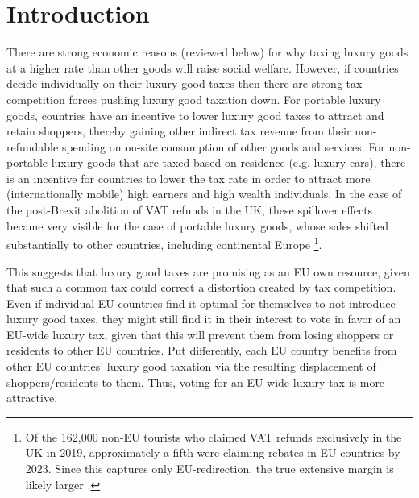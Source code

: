 \documentclass{article}
\begin{document}
\clearpage

\section{Introduction}

There are strong economic reasons (reviewed %
below) for why taxing luxury goods at a higher rate than other goods will raise social welfare. However, if countries decide individually on their luxury good taxes then there are strong tax competition forces pushing luxury good taxation down. For portable luxury goods, countries have an incentive to lower luxury good taxes to attract and retain shoppers, thereby gaining other indirect tax revenue from their non-refundable spending on on-site consumption of other goods and services.  For non-portable luxury goods that are taxed based on residence (e.g. luxury cars), there is an incentive for countries to lower the tax rate in order to attract more (internationally mobile) high earners and high wealth individuals. In the case of the post-Brexit abolition of VAT refunds in the UK, these spillover effects became very visible for the case of portable  luxury goods, whose sales shifted substantially to other countries, including continental Europe \footnote{Of the 162{,}000 non-EU tourists who claimed VAT refunds exclusively in the UK in 2019, approximately a fifth were claiming rebates in EU countries by 2023.  Since this captures only EU-redirection, the true extensive margin is likely larger \cite{Bloomberg2024}.}. 


This suggests that luxury good taxes are promising as an EU own resource, given that such a common tax could correct a distortion created by tax competition. Even if individual EU countries find it optimal for themselves to not introduce luxury good taxes, they might still find it in their interest to vote in favor of an EU-wide luxury tax, given that this will prevent them from losing shoppers or residents to other EU countries. Put differently, each EU country benefits from other EU countries' luxury good taxation via the resulting displacement of  %
shoppers/residents to them. Thus, voting for an EU-wide luxury tax is more attractive.
\end{document}
